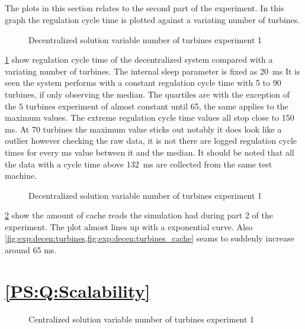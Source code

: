 \subsection{}
The plots in this section relates to the second part of the  experiment. In this graph the regulation cycle time is plotted against a variating number of turbines.

\begin{figure}[h]
	\centering
	
	\caption{Decentralized solution variable number of turbines experiment 1}
	\label{fig:exp:decen:turbines}
\end{figure}

\cref{fig:exp:decen:turbines} show regulation cycle time of the decentralized system compared with a variating number of turbines. The internal sleep parameter is fixed as 20~ms
It is seen the system performs with a constant regulation cycle time with 5 to 90 turbines, if only observing the median.
The quartiles are with the exception of the 5 turbines experiment of almost constant until 65, the same applies to the maximum values.
The extreme regulation cycle time values all  stop close to 150 ms.
At 70 turbines the maximum value sticks out notably it does look like a outlier however checking the raw data, it is not there are logged regulation cycle times for every ms value between it and the median.
It should be noted that all the data with a cycle time above 132~ms are collected from the same test machine.

\begin{figure}[h]
	\centering
	
	\caption{Decentralized solution variable number of turbines experiment 1}
	\label{fig:exp:decen:turbines_cache}
\end{figure}


\cref{fig:exp:decen:turbines_cache} show the amount of cache reads the simulation had during part 2 of the experiment.
The plot almost lines up with a exponential curve. Also \cref{fig:exp:decen:turbines,fig:exp:decen:turbines_cache} seams to suddenly increase around 65 ms.
\clearpage
\section{\ref{PS:Q:Scalability}}\FloatBarrier

\begin{figure}[h]
	\centering
	
	\caption{Centralized solution variable number of turbines experiment 1}
	\label{fig:exp:cen:turbines}
\end{figure}

